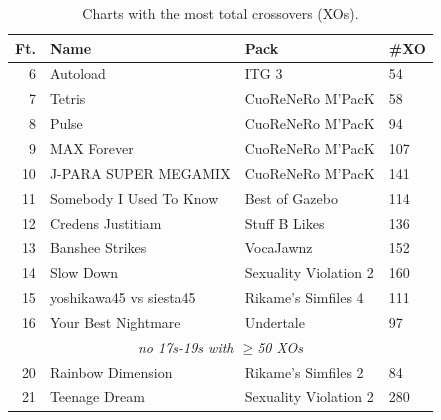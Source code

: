 \documentclass[10pt]{sigplanconf}
\begin{document}
\begin{table}[t]
	\begin{center}
		\small
	\begin{tabular}{r|l|l|l}
		\bf Ft. & \bf Name & \bf Pack & \bf \#XO \\
		\hline
		 6 & Autoload                 & ITG 3                 &  54 \\
		 7 & Tetris                   & CuoReNeRo M'PacK      &  58 \\
		 8 & Pulse                    & CuoReNeRo M'PacK      &  94 \\
		 9 & MAX Forever              & CuoReNeRo M'PacK      & 107 \\
		10 & J-PARA SUPER MEGAMIX     & CuoReNeRo M'PacK      & 141 \\
		11 & Somebody I Used To Know  & Best of Gazebo        & 114 \\
		12 & Credens Justitiam        & Stuff B Likes         & 136 \\
		13 & Banshee Strikes          & VocaJawnz             & 152 \\
		14 & Slow Down                & Sexuality Violation 2 & 160 \\
		15 & yoshikawa45 vs siesta45  & Rikame's Simfiles 4   & 111 \\
		16 & Your Best Nightmare      & Undertale             &  97 \\
		\multicolumn{4}{c}{\em no 17s-19s with $\ge$50 XOs} \\
		20 & Rainbow Dimension        & Rikame's Simfiles 2   &  84 \\
		21 & Teenage Dream            & Sexuality Violation 2 & 280 \\
	\end{tabular}
	\end{center}
	\caption{Charts with the most total crossovers (XOs).}
	\label{tab:chart-xo}
\end{table}
\end{document}
